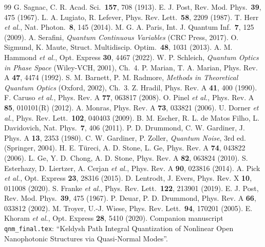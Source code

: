 \documentclass[11pt]{article}
\begin{document}
\begin{thebibliography}{99}
 G. Sagnac, C. R. Acad. Sci.\ \textbf{157}, 708 (1913).
 E. J. Post, Rev. Mod. Phys.\ \textbf{39}, 475 (1967).
 L. A. Lugiato, R. Lefever, Phys. Rev. Lett.\ \textbf{58}, 2209 (1987).
 T. Herr \textit{et al.}, Nat. Photon.\ \textbf{8}, 145 (2014).
 M. G. A. Paris, Int. J. Quantum Inf.\ \textbf{7}, 125 (2009).
 A. Serafini, \textit{Quantum Continuous Variables} (CRC Press, 2017).
 O. Sigmund, K. Maute, Struct. Multidiscip. Optim.\ \textbf{48}, 1031 (2013).
 A. M. Hammond \textit{et al.}, Opt. Express \textbf{30}, 4467 (2022).
 W. P. Schleich, \textit{Quantum Optics in Phase Space} (Wiley-VCH, 2001), Ch.~4.
 P. Marian, T. A. Marian, Phys. Rev. A \textbf{47}, 4474 (1992).
 S. M. Barnett, P. M. Radmore, \textit{Methods in Theoretical Quantum Optics} (Oxford, 2002), Ch.~3.
 Z. Hradil, Phys. Rev. A \textbf{41}, 400 (1990).
 F. Caruso \textit{et al.}, Phys. Rev. A \textbf{77}, 063817 (2008).
 O. Pinel \textit{et al.}, Phys. Rev. A \textbf{85}, 010101(R) (2012).
 A. Monras, Phys. Rev. A \textbf{73}, 033821 (2006).
 U. Dorner \textit{et al.}, Phys. Rev. Lett.\ \textbf{102}, 040403 (2009).
 B. M. Escher, R. L. de Matos Filho, L. Davidovich, Nat. Phys.\ \textbf{7}, 406 (2011).
 P. D. Drummond, C. W. Gardiner, J. Phys. A \textbf{13}, 2353 (1980).
 C. W. Gardiner, P. Zoller, \textit{Quantum Noise}, 3rd ed. (Springer, 2004).
 H. E. T\"ureci, A. D. Stone, L. Ge, Phys. Rev. A \textbf{74}, 043822 (2006).
 L. Ge, Y. D. Chong, A. D. Stone, Phys. Rev. A \textbf{82}, 063824 (2010).
 S. Esterhazy, D. Liertzer, A. Cerjan \textit{et al.}, Phys. Rev. A \textbf{90}, 023816 (2014).
 A. Pick \textit{et al.}, Opt. Express \textbf{23}, 28316 (2015).
 D. Lentrodt, J. Evers, Phys. Rev. X \textbf{10}, 011008 (2020).
 S. Franke \textit{et al.}, Phys. Rev. Lett.\ \textbf{122}, 213901 (2019).
 E. J. Post, Rev. Mod. Phys.\ \textbf{39}, 475 (1967).
 P. Deuar, P. D. Drummond, Phys. Rev. A \textbf{66}, 033812 (2002).
 M. Troyer, U.-J. Wiese, Phys. Rev. Lett.\ \textbf{94}, 170201 (2005).
 E. Khoram \textit{et al.}, Opt. Express \textbf{28}, 5410 (2020).
 Companion manuscript \texttt{qnm\_final.tex}: ``Keldysh Path Integral Quantization of Nonlinear Open Nanophotonic Structures via Quasi-Normal Modes''.
\end{thebibliography}
\end{document}
